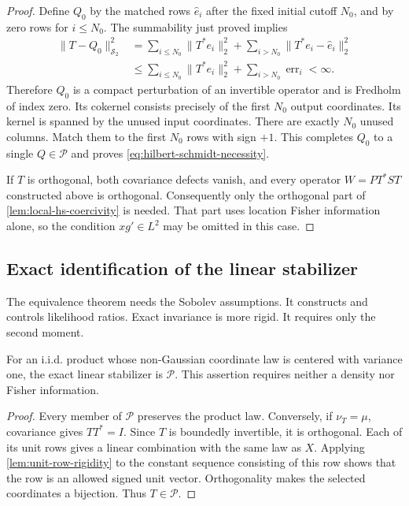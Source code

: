 \begin{proof}
Define $Q_0$ by the matched rows $\widehat e_i$ after the fixed initial cutoff
$N_0$, and by zero rows for $i\leq N_0$.
The summability just proved implies
\[
 \begin{aligned}
 \|T-Q_0\|_{\mathcal S_2}^2
 &=\sum_{i\leq N_0}\|T^*e_i\|_2^2
                      +\sum_{i>N_0}\|T^*e_i-\widehat e_i\|_2^2\\
 &\leq\sum_{i\leq N_0}\|T^*e_i\|_2^2
       +\sum_{i>N_0}\operatorname{err}_i<\infty.
 \end{aligned}
 \]
Therefore $Q_0$ is a compact perturbation of an invertible operator and is
Fredholm of index zero.
Its cokernel consists precisely of the first $N_0$ output coordinates.
Its kernel is spanned by the unused input coordinates.
There are exactly $N_0$ unused columns.
Match them to the first $N_0$ rows with sign $+1$.
This completes $Q_0$ to a single $Q\in\mathcal P$ and proves
\eqref{eq:hilbert-schmidt-necessity}.

If $T$ is orthogonal, both covariance defects vanish, and every
operator $W=P T^*ST$ constructed above is orthogonal.
Consequently only the orthogonal part of
\cref{lem:local-hs-coercivity} is needed.  That part uses location
Fisher information alone, so the condition $xg'\in L^2$ may be
omitted in this case.
\end{proof}

\subsection{Exact identification of the linear stabilizer}
\label{sec:exact-stabilizer}

The equivalence theorem needs the Sobolev assumptions.
It constructs and controls likelihood ratios.
Exact invariance is more rigid.
It requires only the second moment.

\begin{proposition}
\label{prop:exact-linear-stabilizer}
For an i.i.d. product whose non-Gaussian coordinate law is centered with
variance one, the exact linear stabilizer is $\mathcal P$.
This assertion requires neither a density nor Fisher information.
\end{proposition}
\begin{proof}
Every member of $\mathcal P$ preserves the product law.
Conversely, if $\nu_T=\mu$, covariance gives $TT^*=I$.
Since $T$ is boundedly invertible, it is orthogonal.  Each of its unit
rows gives a linear combination with the same law as $X$.
Applying \cref{lem:unit-row-rigidity} to the constant sequence
consisting of this row shows that the row is an allowed signed unit
vector.  Orthogonality makes the selected coordinates a bijection.
Thus $T\in\mathcal P$.
\end{proof}

